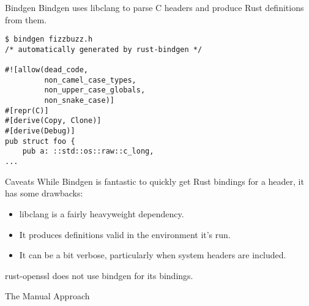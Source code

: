 \documentclass{beamer}
\begin{document}
\begin{frame}[fragile]{Bindgen}
    Bindgen uses libclang to parse C headers and produce Rust definitions from
    them.

    \begin{verbatim}
$ bindgen fizzbuzz.h
/* automatically generated by rust-bindgen */

#![allow(dead_code,
         non_camel_case_types,
         non_upper_case_globals,
         non_snake_case)]
#[repr(C)]
#[derive(Copy, Clone)]
#[derive(Debug)]
pub struct foo {
    pub a: ::std::os::raw::c_long,
...
    \end{verbatim}
\end{frame}

\begin{frame}{Caveats}
    While Bindgen is fantastic to quickly get Rust bindings for a header, it
    has some drawbacks:

    \begin{itemize}
        \item libclang is a fairly heavyweight dependency.
        \item It produces definitions valid in the environment it's run.
        \item It can be a bit verbose, particularly when system headers are
            included.
    \end{itemize}

    rust-openssl does not use bindgen for its bindings.
\end{frame}

\begin{frame}{The Manual Approach}
\end{frame}
\end{document}
